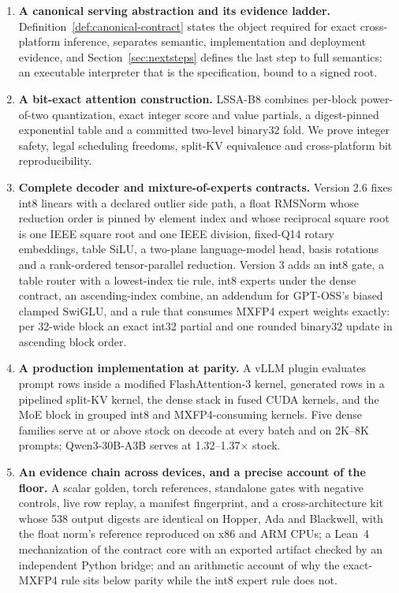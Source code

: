 \documentclass{article}
\begin{document}
\begin{enumerate}
  \item \textbf{A canonical serving abstraction and its evidence ladder.}
  Definition~\ref{def:canonical-contract} states the object required for exact
  cross-platform inference, separates semantic, implementation and deployment evidence, and
  Section~\ref{sec:nextsteps} defines the last step to full semantics: an executable
  interpreter that is the specification, bound to a signed root.

  \item \textbf{A bit-exact attention construction.}  LSSA-B8 combines per-block
  power-of-two quantization, exact integer score and value partials, a digest-pinned
  exponential table and a committed two-level binary32 fold.  We prove integer safety, legal
  scheduling freedoms, split-KV equivalence and cross-platform bit reproducibility.

  \item \textbf{Complete decoder and mixture-of-experts contracts.}  Version 2.6 fixes
  int8 linears with a declared outlier side path, a float RMSNorm whose reduction order is
  pinned by element index and whose reciprocal square root is one IEEE square root and one
  IEEE division, fixed-Q14 rotary embeddings, table SiLU, a two-plane language-model head,
  basis rotations and a rank-ordered tensor-parallel reduction.  Version 3 adds an int8 gate,
  a table router with a lowest-index tie rule, int8 experts under the dense contract, an
  ascending-index combine, an addendum for GPT-OSS's biased clamped SwiGLU, and a rule that
  consumes MXFP4 expert weights exactly: per 32-wide block an exact int32 partial and one
  rounded binary32 update in ascending block order.

  \item \textbf{A production implementation at parity.}  A vLLM plugin evaluates prompt rows
  inside a modified FlashAttention-3 kernel, generated rows in a pipelined split-KV kernel,
  the dense stack in fused CUDA kernels, and the MoE block in grouped int8 and
  MXFP4-consuming kernels.  Five dense families serve at or above stock on decode at every
  batch and on 2K--8K prompts; Qwen3-30B-A3B serves at 1.32--1.37$\times$ stock.

  \item \textbf{An evidence chain across devices, and a precise account of the floor.}  A
  scalar golden, torch references, standalone gates with negative controls, live row replay,
  a manifest fingerprint, and a cross-architecture kit whose 538 output digests are identical
  on Hopper, Ada and Blackwell, with the float norm's reference reproduced on x86 and ARM
  CPUs; a Lean~4 mechanization of the contract core with an exported artifact checked by an
  independent Python bridge; and an arithmetic account of why the exact-MXFP4 rule sits
  below parity while the int8 expert rule does not.
\end{enumerate}
\end{document}
